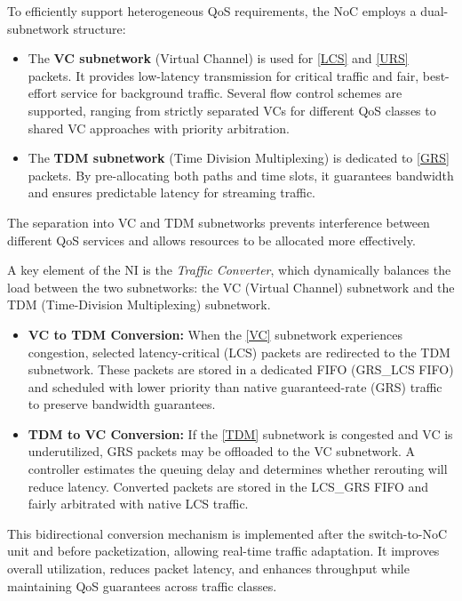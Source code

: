 To efficiently support heterogeneous QoS requirements, the NoC employs a dual-subnetwork structure:
\begin{itemize}
    \item The \textbf{VC subnetwork}\label{VC} (Virtual Channel) is used for \ref{LCS} and \ref{URS} packets. It provides low-latency transmission for critical traffic and fair, best-effort service for background traffic. Several flow control schemes are supported, ranging from strictly separated VCs for different QoS classes to shared VC approaches with priority arbitration.
    \item The \textbf{TDM subnetwork}\label{TDM} (Time Division Multiplexing) is dedicated to \ref{GRS} packets. By pre-allocating both paths and time slots, it guarantees bandwidth and ensures predictable latency for streaming traffic.
\end{itemize}
The separation into VC and TDM subnetworks prevents interference between different QoS services and allows resources to be allocated more effectively.


A key element of the NI is the \textit{Traffic Converter}, which dynamically balances the load between the two subnetworks: the VC (Virtual Channel) subnetwork and the TDM (Time-Division Multiplexing) subnetwork.
\begin{itemize}
    \item \textbf{VC to TDM Conversion:} When the \ref{VC} subnetwork experiences congestion, selected latency-critical (LCS) packets are redirected to the TDM subnetwork. These packets are stored in a dedicated FIFO (GRS\_LCS FIFO) and scheduled with lower priority than native guaranteed-rate (GRS) traffic to preserve bandwidth guarantees.
    \item \textbf{TDM to VC Conversion:} If the \ref{TDM} subnetwork is congested and VC is underutilized, GRS packets may be offloaded to the VC subnetwork. A controller estimates the queuing delay and determines whether rerouting will reduce latency. Converted packets are stored in the LCS\_GRS FIFO and fairly arbitrated with native LCS traffic.
\end{itemize}
This bidirectional conversion mechanism is implemented after the switch-to-NoC unit and before packetization, allowing real-time traffic adaptation. It improves overall utilization, reduces packet latency, and enhances throughput while maintaining QoS guarantees across traffic classes.
